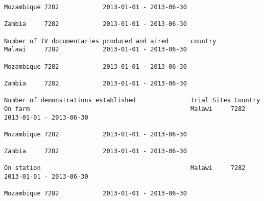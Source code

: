 \documentclass[11pt]{article}
\begin{document}
\begin{Verbatim}[commandchars=\\\{\}]
                                                                                                                                                                                                                 Mozambique 7282            2013-01-01 - 2013-06-30   
                                                                                                                                                                                                                 Zambia     7282            2013-01-01 - 2013-06-30   
                                                                         Number of TV documentaries produced and aired      country                                                                              Malawi     7282            2013-01-01 - 2013-06-30   
                                                                                                                                                                                                                 Mozambique 7282            2013-01-01 - 2013-06-30   
                                                                                                                                                                                                                 Zambia     7282            2013-01-01 - 2013-06-30   
                                                                         Number of demonstrations established               Trial Sites Country               On farm                                            Malawi     7282            2013-01-01 - 2013-06-30   
                                                                                                                                                                                                                 Mozambique 7282            2013-01-01 - 2013-06-30   
                                                                                                                                                                                                                 Zambia     7282            2013-01-01 - 2013-06-30   
                                                                                                                                                              On station                                         Malawi     7282            2013-01-01 - 2013-06-30   
                                                                                                                                                                                                                 Mozambique 7282            2013-01-01 - 2013-06-30   

\end{Verbatim}
\end{document}
